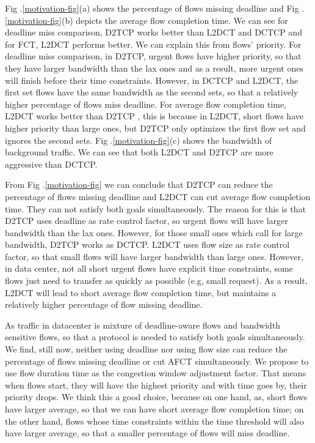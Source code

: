 \documentclass[10pt, conference, letterpaper]{IEEEtran}
\begin{document}
Fig .\ref{motivation-fig}(a) shows the percentage of flows missing deadline and Fig .\ref{motivation-fig}(b) depicts the average flow completion time.
We can see for deadline miss comparison, D2TCP works better than L2DCT and DCTCP and for FCT, L2DCT performs better.
We can explain this from flows' priority.
For deadline miss comparison,
in D2TCP, urgent flows have higher priority, so that they have larger bandwidth than the lax ones and as a result, more urgent ones will finish before their time constraints.
However, in DCTCP and L2DCT, the first set flows have the same bandwidth as the second sets, so that a relatively higher percentage of flows miss deadline.
For average flow completion time, L2DCT works better than D2TCP , this is because in L2DCT, short flows have higher priority than large ones, but D2TCP only optimizes the first flow set and ignores the second sets.
Fig .\ref{motivation-fig}(c) shows the bandwidth of background traffic. 
We can see that both L2DCT and D2TCP are more aggressive than DCTCP.


From Fig .\ref{motivation-fig} we can conclude that D2TCP can reduce the percentage of flows missing deadline and L2DCT can cut average flow completion time.
They can not satisfy both goals simultaneously. The reason for this is that D2TCP uses deadline as
rate control factor, so urgent flows will have larger bandwidth than the lax ones. 
However, for those small ones which call for large bandwidth,  D2TCP works 
as DCTCP. L2DCT uses flow size as rate control factor, so that small flows will have larger bandwidth than large ones. However, 
in data center, not all short urgent flows have explicit time constraints, some flows just need to transfer as quickly as possible (e.g, small request). 
As a result, L2DCT will lead to short average flow completion time, but maintains a relatively higher percentage of flow missing deadline.

As traffic in datacenter is mixture of deadline-aware flows and bandwidth sensitive flows, so that a protocol is needed to satisfy both goals simultaneously.
We find, still now, neither using deadline nor using flow size can reduce the percentage of flows missing deadline or cut AFCT simultaneously.
We propose to use flow duration time as the congestion window adjustment factor.
That means when flows start, they will have the highest priority and with time goes by, their priority drops. 
We think this a good choice, because on one hand, as, short flows have larger average, so that we can have short average flow completion time;
on the other hand, flows whose time constraints within the time threshold will also have larger average, so that a smaller percentage of flows will miss deadline.
\end{document}
